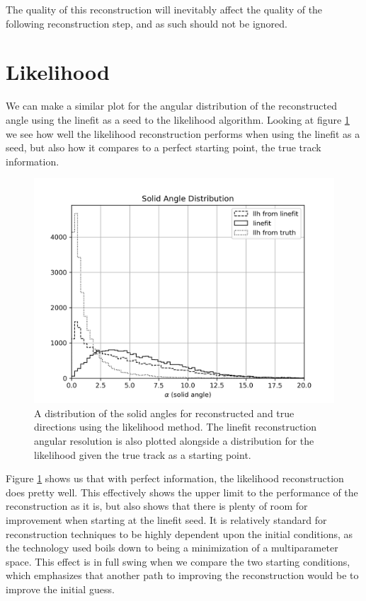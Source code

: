 The quality of this reconstruction will inevitably affect the quality of the following reconstruction step, and as such should not be ignored. 

\section{Likelihood}

We can make a similar plot for the angular distribution of the reconstructed angle using the linefit as a seed to the likelihood algorithm. Looking at figure \ref{fig:alpha_llh} we see how well the likelihood reconstruction performs when using the linefit as a seed, but also how it compares to a perfect starting point, the true track information.

\begin{figure}[H]
  \centering
  \includegraphics[width=12cm]{./Figures/reco_plots/alpha_dist_llh_count.png}
  \caption{A distribution of the solid angles for reconstructed and true directions using the likelihood method. The linefit reconstruction angular resolution is also plotted alongside a distribution for the likelihood given the true track as a starting point.}
  \label{fig:alpha_llh}
\end{figure}

Figure \ref{fig:alpha_llh} shows us that with perfect information, the likelihood reconstruction does pretty well. This effectively shows the upper limit to the performance of the reconstruction as it is, but also shows that there is plenty of room for improvement when starting at the linefit seed. It is relatively standard for reconstruction techniques to be highly dependent upon the initial conditions, as the technology used boils down to being a minimization of a multiparameter space. This effect is in full swing when we compare the two starting conditions, which emphasizes that another path to improving the reconstruction would be to improve the initial guess.

